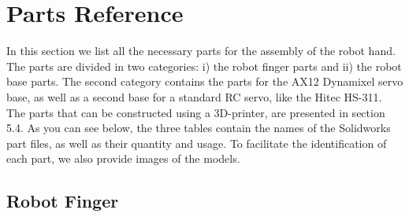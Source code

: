 \section{Parts Reference}

In this section we list all the necessary parts for the assembly of the robot hand. The parts are divided in two categories: i) the robot finger parts and ii) the robot base parts. The second category contains the parts for the AX12 Dynamixel servo base, as well as a second base for a standard RC servo, like the Hitec HS-311. The parts that can be constructed using a 3D-printer, are presented in section 5.4.  As you can see below, the three tables contain the names of the Solidworks part files, as well as their quantity and usage. To facilitate the identification of each part, we also provide images of the models. 

\subsection{Robot Finger}

